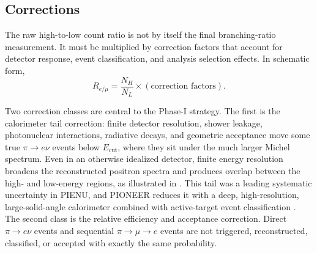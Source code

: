 \subsection{Corrections}
\label{subsec:measurement-corrections}

The raw high-to-low count ratio is not by itself the final branching-ratio
measurement. It must be multiplied by correction factors that account for
detector response, event classification, and analysis selection effects. In
schematic form,
\begin{equation}
  R_{e/\mu}
  =
  \frac{N_H}{N_L}
  \times
  \left(\text{correction factors}\right).
  \label{eq:remu-schematic-corrections}
\end{equation}

Two correction classes are central to the Phase-I strategy. The first is the
calorimeter tail correction: finite detector resolution, shower leakage,
photonuclear interactions, radiative decays, and geometric acceptance move
some true \(\pi\to e\nu\) events below \(E_{\mathrm{cut}}\), where they sit
under the much larger Michel spectrum. Even in an otherwise idealized detector,
finite energy resolution broadens the reconstructed positron spectra and
produces overlap between the high- and low-energy regions, as illustrated in
. This tail was a leading
systematic uncertainty in PIENU, and PIONEER reduces it with a deep,
high-resolution, large-solid-angle calorimeter combined with active-target
event classification \cite{pioneer_proposal_2022,pioneer_rare_2022}. The
second class is the relative efficiency and acceptance correction. Direct
\(\pi\to e\nu\) events and sequential \(\pi\to\mu\to e\) events are not
triggered, reconstructed, classified, or accepted with exactly the same
probability.

